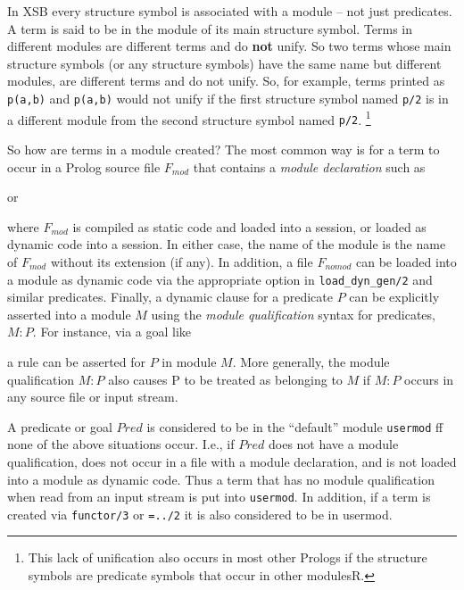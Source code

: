 In XSB every structure symbol is associated with a module -- not just
predicates.  A term is said to be in the module of its main structure
symbol.  Terms in different modules are different terms and do {\bf
  not} unify.  So two terms whose main structure symbols (or any
structure symbols) have the same name but different modules, are
different terms and do not unify.  So, for example, terms printed as
{\tt p(a,b)} and {\tt p(a,b)} would not unify if the first structure
symbol named {\tt p/2} is in a different module from the second
structure symbol named {\tt p/2}. \footnote{This lack of unification
  also occurs in most other Prologs if the structure symbols are
  predicate symbols that occur in other modulesR.}

So how are terms in a module created?  The most common way
is for a term to occur in a Prolog source file $F_{mod}$ that contains
a {\em module declaration} such as


or


\noindent 
where $F_{mod}$ is compiled as static code and loaded into a session,
or loaded as dynamic code into a session.  In either case, the name of
the module is the name of $F_{mod}$ without its extension (if any).
In addition, a file $F_{nomod}$ can be loaded into a module as dynamic
code via the appropriate option in {\tt load\_dyn\_gen/2} and similar
predicates.  Finally, a dynamic clause for a predicate $P$ can be
explicitly asserted into a module $M$ using the {\em module
  qualification} syntax for predicates, $M:P$.  For instance, via a
goal like


\noindent
a rule can be asserted for $P$ in module $M$.  More generally, the
module qualification $M:P$ also causes P to be treated as belonging to
$M$ if $M:P$ occurs in any source file or input stream.


A predicate or goal $Pred$ is considered to be in the ``default''
module {\tt usermod} ff none of the above situations occur.  I.e., if
$Pred$ does not have a module qualification, does not occur in a file
with a module declaration, and is not loaded into a module as dynamic
code.  Thus a term that has no module qualification when read from an
input stream is put into {\tt usermod}.  In addition, if a term is
created via {\tt functor/3} or {\tt =../2} it is also considered to be
in usermod.


